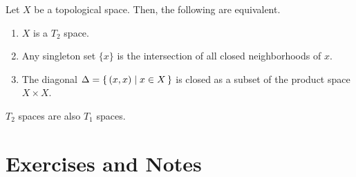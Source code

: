 %
\begin{thmbox}
    \begin{proposition}
        Let \(X\) be a {\color{mathif}topological space}. Then, the following are {\color{mathrem}equivalent}.
        \begin{enumerate}
            \item \(X\) is a {\color{maththen}\(T_2\) space}.
            \item Any singleton set \(\{x\}\) is the intersection of all closed neighborhoods of \(x\).
            \item The diagonal \(\Delta = \left\{\, (x, x) \mid x \in X \,\right\}\) is closed as a subset of the product space \(X \times X\).
        \end{enumerate}
    \end{proposition}
\end{thmbox}
%
\begin{thmbox}
    \begin{proposition}
        \(T_2\) spaces are also \(T_1\) spaces.
    \end{proposition}
\end{thmbox}
\newpage
\section{Exercises and Notes}